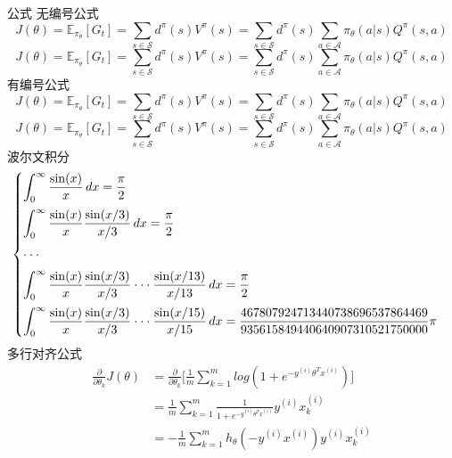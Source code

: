 \documentclass[dvipsnames, svgnames,a4paper,11pt]{article}
\begin{document}
\begin{tbox}{公式}
	无编号公式
    \begin{equation*}
        J(\theta) = \mathbb{E}_{\pi_\theta}[G_t] = \sum_{s\in\mathcal{S}} d^\pi (s)V^\pi(s)=\sum_{s\in\mathcal{S}} d^\pi(s)\sum_{a\in\mathcal{A}}\pi_\theta(a|s)Q^\pi(s,a)
    \end{equation*}
$$ J(\theta) = \mathbb{E}_{\pi_\theta}[G_t] = \sum_{s\in\mathcal{S}} d^\pi (s)V^\pi(s)=\sum_{s\in\mathcal{S}} d^\pi(s)\sum_{a\in\mathcal{A}}\pi_\theta(a|s)Q^\pi(s,a) $$
    有编号公式
    \begin{equation}
        J(\theta) = \mathbb{E}_{\pi_\theta}[G_t] = \sum_{s\in\mathcal{S}} d^\pi (s)V^\pi(s)=\sum_{s\in\mathcal{S}} d^\pi(s)\sum_{a\in\mathcal{A}}\pi_\theta(a|s)Q^\pi(s,a)
    \end{equation}
    \begin{equation}
        J(\theta) = \mathbb{E}_{\pi_\theta}[G_t] = \sum_{s\in\mathcal{S}} d^\pi (s)V^\pi(s)=\sum_{s\in\mathcal{S}} d^\pi(s)\sum_{a\in\mathcal{A}}\pi_\theta(a|s)Q^\pi(s,a)
    \end{equation}
	波尔文积分
    \[
    \begin{cases}
        \vspace{0.2cm}
        \displaystyle{\int_{0}^{\infty} \frac{\sin(x)}{x}\,dx = \frac{\pi}{2}}\\
        \vspace{0.2cm}
        \displaystyle{\int_{0}^{\infty} \frac{\sin(x)}{x} \frac{\sin(x/3)}{x/3}\,dx = \frac{\pi}{2}} \\
        \vspace{0.2cm}\cdot\cdot\cdot\\
        \vspace{0.2cm}
        \displaystyle{\int_{0}^{\infty} \frac{\sin(x)}{x} \frac{\sin(x/3)}{x/3} \cdot\cdot\cdot \frac{\sin(x/13)}{x/13}\,dx = \frac{\pi}{2}}\\
        \displaystyle{\int_{0}^{\infty} \frac{\sin(x)}{x} \frac{\sin(x/3)}{x/3} \cdot\cdot\cdot \frac{\sin(x/15)}{x/15}\,dx = \frac{467807924713440738696537864469}{935615849440640907310521750000}\pi}
    \end{cases}  
    \]
	多行对齐公式
\begin{align*}
    \frac{\partial}{\partial \theta_k}J(\theta) 
        &= \frac{\partial}{\partial \theta_k}\Bigg[\frac{1}{m}\sum_{k=1}^m log(1+e^{-y^{(i)}\theta^Tx^{(i)}})\Bigg] \\
        &= \frac{1}{m}\sum_{k=1}^m \frac{1}{1+e^{-y^{(i)}\theta^Tx^{(i)}}}y^{(i)}x_k^{(i)} \\
        &= -\frac{1}{m}\sum_{k=1}^m h_\theta(-y^{(i)}x^{(i)})y^{(i)}x_k^{(i)}        
\end{align*}
\end{tbox}
\end{document}
